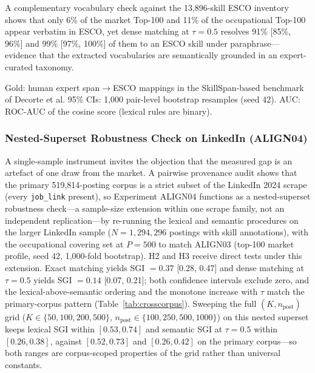 \documentclass[journal]{IEEEtran}
\begin{document}
A complementary vocabulary check against the 13,896-skill ESCO
inventory shows that only 6\% of the market Top-100 and 11\% of the
occupational Top-100 appear verbatim in ESCO, yet dense matching at $\tau =
0.5$ resolves 91\% [85\%, 96\%] and 99\% [97\%, 100\%] of them to an ESCO
skill under paraphrase---evidence that the extracted vocabularies are
semantically grounded in an expert-curated taxonomy.

\begin{table}[!htbp]
\centering
\caption{Agreement with Expert ESCO Mappings (VALID01; 2,907 Pairs)}
\label{tab:validity}
\resizebox{\columnwidth}{!}{%

}
\par\vspace{3pt}
{\footnotesize Gold: human expert span$\to$ESCO mappings in the SkillSpan-based
benchmark of Decorte et al. 95\% CIs: 1,000 pair-level bootstrap resamples
(seed 42). AUC: ROC-AUC of the cosine score (lexical rules are binary).}
\end{table}

\subsubsection{Nested-Superset Robustness Check on LinkedIn (ALIGN04)}
\label{sec:align04}

A single-sample instrument invites the objection that the measured gap is an artefact of one draw from the market. A pairwise provenance audit shows that the primary 519,814-posting corpus is a strict subset of the LinkedIn 2024 scrape (every \texttt{job\_link} present), so Experiment ALIGN04 functions as a nested-superset robustness check---a sample-size extension within one scrape family, not an independent replication---by re-running the lexical and semantic procedures on the larger LinkedIn sample ($N = 1{,}294{,}296$ postings with skill annotations), with the occupational covering set at $P = 500$ to match ALIGN03 (top-100 market profile, seed 42, 1,000-fold bootstrap). H2 and H3 receive direct tests under this extension. Exact matching yields SGI $= 0.37$ [0.28, 0.47] and dense matching at $\tau = 0.5$ yields SGI $= 0.14$ [0.07, 0.21]; both confidence intervals exclude zero, and the lexical-above-semantic ordering and the monotone increase with $\tau$ match the primary-corpus pattern (Table~\ref{tab:crosscorpus}). Sweeping the full $(K, n_{\text{post}})$ grid ($K \in \{50, 100, 200, 500\}$, $n_{\text{post}} \in \{100, 250, 500, 1000\}$) on this nested superset keeps lexical SGI within $[0.53, 0.74]$ and semantic SGI at $\tau = 0.5$ within $[0.26, 0.38]$, against $[0.52, 0.73]$ and $[0.26, 0.42]$ on the primary corpus---so both ranges are corpus-scoped properties of the grid rather than universal constants.
\end{document}
